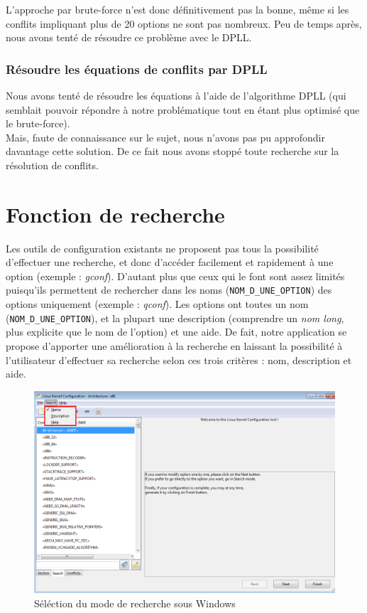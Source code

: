 ﻿\documentclass[17pts]{report}
\begin{document}
L'approche par brute-force n'est donc définitivement pas la bonne, même si les
conflits impliquant plus de 20 options ne sont pas nombreux.
Peu de temps après, nous avons tenté de résoudre ce problème avec le DPLL.\\

\subsubsection{Résoudre les équations de conflits par DPLL}
\label{ssub:Résoudre les équations de conflits par DPLL}
Nous avons tenté de résoudre les équations à l'aide de l'algorithme DPLL (qui
semblait pouvoir répondre à notre problématique tout en étant plus optimisé
que le brute-force).\\
Mais, faute de connaissance sur le sujet, nous n'avons pas pu
approfondir davantage cette solution. De ce fait nous avons stoppé toute
recherche sur la résolution de conflits.


\section{Fonction de recherche}
\label{sec:Fonction de recherche}
Les outils de configuration existants ne proposent pas tous la possibilité
d'effectuer une recherche, et donc d'accéder facilement et rapidement à une
option (exemple : \textit{gconf}). D'autant plus que ceux qui le font sont
assez limités puisqu'ils permettent de rechercher dans les noms
(\verb|NOM_D_UNE_OPTION|) des options uniquement (exemple : \textit{qconf}).
Les options ont toutes un nom (\verb|NOM_D_UNE_OPTION|), et la plupart une
description (comprendre un \textit{nom long}, plus explicite que le nom de
l'option) et une aide.  De fait, notre application se propose d'apporter une
amélioration à la recherche en laissant la possibilité à l'utilisateur
d'effectuer sa recherche selon ces trois critères : nom, description et aide.\\

\begin{figure}[H]
    \includegraphics[scale=0.4]{./illustrations/screen_search.png}
    \centering
    \caption{Séléction du mode de recherche sous Windows}
    \label{fig:ModesDeRecherche}
\end{figure}
\end{document}
